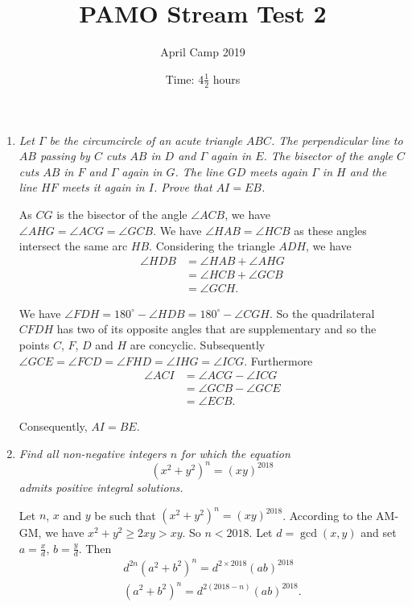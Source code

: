 \documentclass[a4paper, 12pt]{article}
\title{PAMO Stream Test 2}
\author{April Camp 2019}
\date{Time: $4 \frac{1}{2}$ hours}
\begin{document}
 \maketitle

\begin{enumerate}

\item {\itshape Let $\Gamma$ be the circumcircle of an acute triangle $ABC$. The perpendicular line to $AB$ passing by $C$ cuts $AB$ in $D$ and $\Gamma$ again in $E$. The bisector of the angle $C$ cuts $AB$ in $F$ and $\Gamma$ again in $G$. The line $GD$ meets again $\Gamma$ in $H$ and the line $HF$ meets it again in $I$. Prove that $AI = EB$.}

As $CG$ is the bisector of the angle $\angle ACB$, we have $\angle AHG = \angle ACG = \angle GCB$. We have $\angle HAB = \angle HCB$ as these angles intersect the same arc $HB$. Considering the triangle $ADH$, we have
\begin{align*}
    \angle HDB & = \angle HAB + \angle AHG \\
        & = \angle HCB + \angle GCB \\
        & = \angle GCH.
\end{align*}

We have $\angle FDH = 180^\circ - \angle HDB = 180^\circ - \angle CGH$. So the quadrilateral $CFDH$ has two of its opposite angles that are supplementary and so the points $C$, $F$, $D$ and $H$ are concyclic. Subsequently $\angle GCE = \angle FCD = \angle FHD = \angle IHG = \angle ICG$. Furthermore
\begin{align*}
    \angle ACI & = \angle ACG - \angle ICG \\
        & = \angle GCB - \angle GCE \\
        & = \angle ECB.
\end{align*}

Consequently, $AI = BE$.


\item {\itshape Find all non-negative integers $n$ for which the equation
\[
    {\left( x^2 + y^2 \right)}^n = {(xy)}^{2018}
\]
admits positive integral solutions.}

Let $n$, $x$ and $y$ be such that ${(x^2 + y^2)}^n = {(xy)}^{2018}$. According to the AM-GM, we have $x^2 + y^2 \geq 2xy > xy$. So $n < 2018$. Let $d = \gcd(x, y)$ and set $a = \frac{x}{d}$, $b = \frac{y}{d}$. Then
\begin{eqnarray*}
    d^{2n} {(a^2 + b^2)}^n = d^{2 \times 2018} {(ab)}^{2018} \\
    {(a^2 + b^2)}^n = d^{2(2018 - n)} {(ab)}^{2018}.
\end{eqnarray*}


\end{enumerate}
\end{document}
